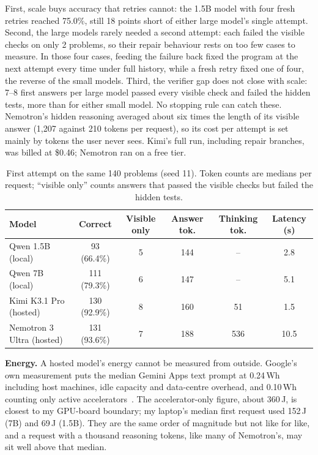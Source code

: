 \documentclass[11pt,a4paper]{article}
\begin{document}
First, scale buys accuracy that retries cannot: the 1.5B model with four fresh retries reached 75.0\%, still 18 points short of either large model's single attempt. Second, the large models rarely needed a second attempt: each failed the visible checks on only 2 problems, so their repair behaviour rests on too few cases to measure. In those four cases, feeding the failure back fixed the program at the next attempt every time under full history, while a fresh retry fixed one of four, the reverse of the small models. Third, the verifier gap does not close with scale: 7--8 first answers per large model passed every visible check and failed the hidden tests, more than for either small model. No stopping rule can catch these. Nemotron's hidden reasoning averaged about six times the length of its visible answer (1{,}207 against 210 tokens per request), so its cost per attempt is set mainly by tokens the user never sees. Kimi's full run, including repair branches, was billed at \$0.46; Nemotron ran on a free tier.

\begin{table}[H]
\centering\small
\caption{First attempt on the same 140 problems (seed 11). Token counts are medians per request; ``visible only'' counts answers that passed the visible checks but failed the hidden tests.}
\label{tab:scale}
\begin{tabular}{@{}lccccc@{}}
\toprule
Model & Correct & Visible only & Answer tok. & Thinking tok. & Latency (s) \\
\midrule
Qwen 1.5B (local) & 93 (66.4\%) & 5 & 144 & -- & 2.8 \\
Qwen 7B (local) & 111 (79.3\%) & 6 & 147 & -- & 5.1 \\
Kimi K3.1 Pro (hosted) & 130 (92.9\%) & 8 & 160 & 51 & 1.5 \\
Nemotron 3 Ultra (hosted) & 131 (93.6\%) & 7 & 188 & 536 & 10.5 \\
\bottomrule
\end{tabular}
\end{table}

\textbf{Energy.} A hosted model's energy cannot be measured from outside. Google's own measurement puts the median Gemini Apps text prompt at 0.24\,Wh including host machines, idle capacity and data-centre overhead, and 0.10\,Wh counting only active accelerators~\cite{google2025gemini}. The accelerator-only figure, about 360\,J, is closest to my GPU-board boundary; my laptop's median first request used 152\,J (7B) and 69\,J (1.5B). They are the same order of magnitude but not like for like, and a request with a thousand reasoning tokens, like many of Nemotron's, may sit well above that median.
\end{document}
